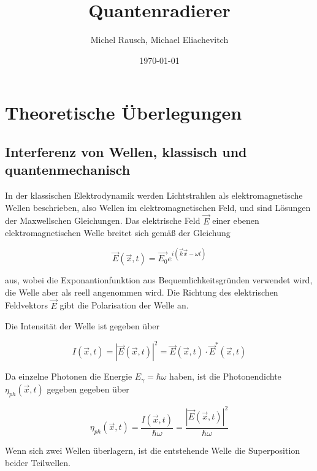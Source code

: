 \documentclass[a4paper,ngerman]{scrartcl}
\title{Quantenradierer}
\date{\today}
\author{Michel Rausch, Michael Eliachevitch}
\begin{document}
\maketitle
\tableofcontents
\thispagestyle{empty} %
\newpage
\setcounter{page}{1}

\section{Theoretische Überlegungen}
\label{sec:theorie}

\subsection{Interferenz von Wellen, klassisch und quantenmechanisch}
\label{sec:interferenz}

In der klassischen Elektrodynamik werden Lichtstrahlen als elektromagnetische Wellen beschrieben, also Wellen im elektromagnetischen Feld,
und sind Lösungen der Maxwellschen Gleichungen. Das elektrische Feld $\vec{E}$ einer ebenen elektromagnetischen Welle breitet sich gemäß der
Gleichung

\begin{equation}
\vec{E}(\vec{x},t) = \vec{E_0} e^{i(\vec{k}\vec{x}-\omega t)}
\end{equation}

aus, wobei die Exponantionfunktion aus Bequemlichkeitsgründen verwendet wird, die Welle aber
als reell angenommen wird. Die Richtung des elektrischen Feldvektors $\vec{E}$ gibt die Polarisation der Welle an.

Die Intensität der Welle ist gegeben über 

\begin{equation}
I(\vec{x},t) = |\vec{E}(\vec{x},t)|^2 = \vec{E}(\vec{x},t) \cdot \vec{E}^*(\vec{x},t)
\end{equation}

Da einzelne Photonen die Energie $E_\gamma = \hbar \omega$ haben, ist die Photonendichte $\eta_{ph}(\vec{x},t)$ gegeben gegeben über

\begin{equation}
  \eta_{ph}(\vec{x},t) = \frac{I(\vec{x},t)}{\hbar \omega} = \frac{|\vec{E}(\vec{x},t)|^2}{\hbar \omega}
\end{equation}

Wenn sich zwei Wellen überlagern, ist die entstehende Welle die Superposition beider Teilwellen.\\
\end{document}
